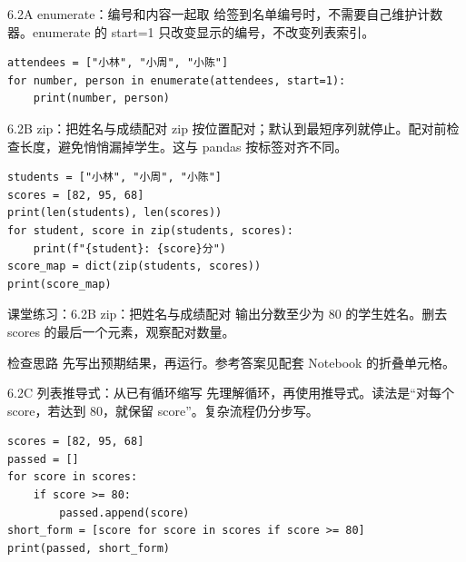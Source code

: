 \begin{frame}[fragile]{6.2A enumerate：编号和内容一起取}
\small 给签到名单编号时，不需要自己维护计数器。enumerate 的 start=1 只改变显示的编号，不改变列表索引。
\medskip
\begin{lstlisting}
attendees = ["小林", "小周", "小陈"]
for number, person in enumerate(attendees, start=1):
    print(number, person)
\end{lstlisting}
\end{frame}

\begin{frame}[fragile]{6.2B zip：把姓名与成绩配对}
\small zip 按位置配对；默认到最短序列就停止。配对前检查长度，避免悄悄漏掉学生。这与 pandas 按标签对齐不同。
\medskip
\begin{lstlisting}
students = ["小林", "小周", "小陈"]
scores = [82, 95, 68]
print(len(students), len(scores))
for student, score in zip(students, scores):
    print(f"{student}: {score}分")
score_map = dict(zip(students, scores))
print(score_map)
\end{lstlisting}
\end{frame}
\begin{frame}[fragile]{课堂练习：6.2B zip：把姓名与成绩配对}
输出分数至少为 80 的学生姓名。删去 scores 的最后一个元素，观察配对数量。
\medskip
\begin{block}{检查思路}
先写出预期结果，再运行。参考答案见配套 Notebook 的折叠单元格。
\end{block}
\end{frame}

\begin{frame}[fragile]{6.2C 列表推导式：从已有循环缩写}
\small 先理解循环，再使用推导式。读法是“对每个 score，若达到 80，就保留 score”。复杂流程仍分步写。
\medskip
\begin{lstlisting}
scores = [82, 95, 68]
passed = []
for score in scores:
    if score >= 80:
        passed.append(score)
short_form = [score for score in scores if score >= 80]
print(passed, short_form)
\end{lstlisting}
\end{frame}
